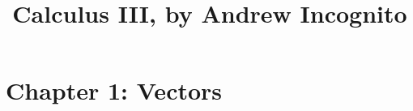 \documentclass[12pt,handout,twocolumn,twoside,wordchoicegiven]{xourse}
\title{Calculus III, by Andrew Incognito}
\begin{document}
\maketitle

\setcounter{tocdepth}{2}





\part{Chapter 1: Vectors}
\end{document}
